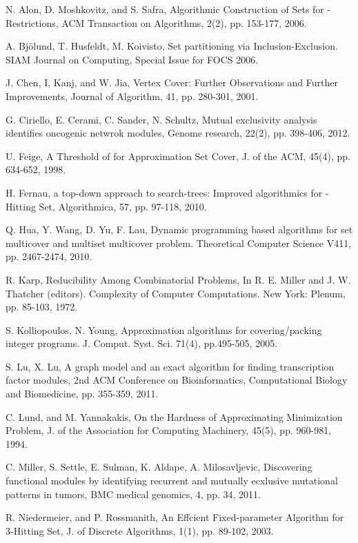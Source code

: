 \documentclass[11pt]{article}
\begin{document}
\begin{thebibliography}{10}

N. Alon, D. Moshkovitz, and S. Safra, Algorithmic Construction of
Sets for -Restrictions, ACM Transaction on Algorithms, 2(2),
pp. 153-177, 2006.

A. Bj\"olund, T. Husfeldt, M. Koivisto, Set partitioning via
Inclusion-Exclusion. SIAM Journal on Computing, Special Issue for
FOCS 2006.

J. Chen, I, Kanj, and W. Jia, Vertex Cover: Further Observations
and Further Improvements, Journal of Algorithm, 41, pp. 280-301,
2001.

G. Ciriello, E. Cerami, C. Sander, N. Schultz, Mutual exclusivity
analysis identifies oncogenic netwrok modules, Genome research,
22(2), pp. 398-406, 2012.

U. Feige, A Threshold of  for Approximation Set Cover, J.
of the ACM, 45(4), pp. 634-652, 1998.

H. Fernau, a top-down approach to search-trees: Improved
algorithmics for -Hitting Set, Algorithmica, 57, pp. 97-118,
2010.

Q. Hua, Y. Wang, D. Yu, F. Lau, Dynamic programming based
algorithms for set multicover and multiset multicover problem.
Theoretical Computer Science V411, pp. 2467-2474, 2010.

R. Karp, Reducibility Among Combinatorial Problems, In R. E.
Miller and J. W. Thatcher (editors). Complexity of Computer
Computations. New York: Plenum, pp. 85-103, 1972.

S. Kolliopoulos, N. Young, Approximation algorithms for
covering/packing integer programs. J. Comput. Syst. Sci. 71(4),
pp.495-505, 2005.

S. Lu, X. Lu, A graph model and an exact algorithm for finding
transcription factor modules, 2nd ACM Conference on
Bioinformatics, Computational Biology and Biomedicine, pp.
355-359, 2011.

C. Lund, and M. Yannakakis, On the Hardness of Approximating
Minimization Problem, J. of the Association for Computing
Machinery, 45(5), pp. 960-981, 1994.

C. Miller, S. Settle, E. Sulman, K. Aldape, A. Milosavljevic,
Discovering functional modules by identifying recurrent and
mutually ecxlusive mutational patterns in tumors, BMC medical
genomics, 4, pp. 34, 2011.

R. Niedermeier, and P. Rossmanith, An Effcient Fixed-parameter
Algorithm for 3-Hitting Set, J. of Discrete Algorithms, 1(1), pp.
89-102, 2003.

\end{thebibliography}
\end{document}

